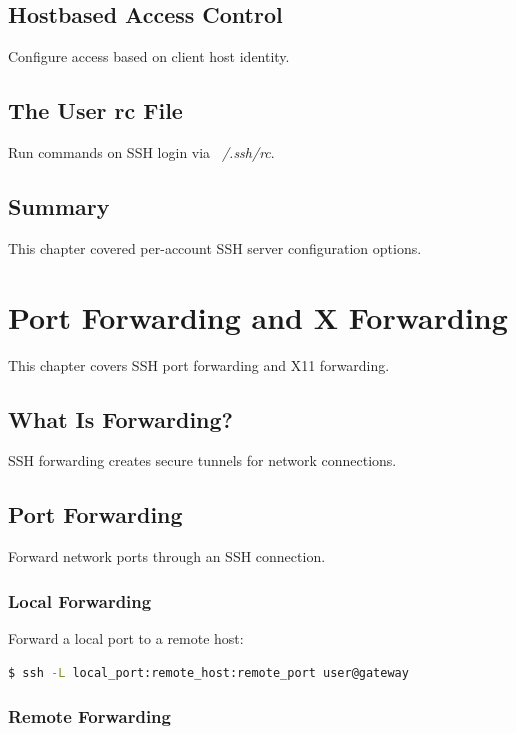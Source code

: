 \documentclass[12pt]{book}
\begin{document}
\section{Hostbased Access Control}

Configure access based on client host identity.

\section{The User rc File}

Run commands on SSH login via \textit{~/.ssh/rc}.

\section{Summary}

This chapter covered per-account SSH server configuration options.

\chapter{Port Forwarding and X Forwarding}

This chapter covers SSH port forwarding and X11 forwarding.

\section{What Is Forwarding?}

SSH forwarding creates secure tunnels for network connections.

\section{Port Forwarding}

Forward network ports through an SSH connection.

\subsection{Local Forwarding}

Forward a local port to a remote host:

\begin{lstlisting}[language=bash]
$ ssh -L local_port:remote_host:remote_port user@gateway
\end{lstlisting}

\subsection{Remote Forwarding}
\end{document}
